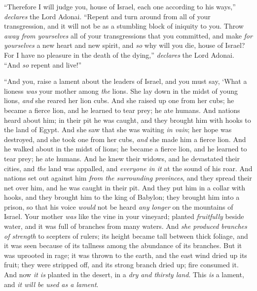 \begin{biblechapter}
\verse “Therefore I will judge you, house of Israel, each one according to his ways,” \textit{declares} the Lord Adonai. “Repent and turn around from all of your transgression, and it will not be as a stumbling block of iniquity to you.
\verse Throw \textit{away from yourselves} all of your transgressions that you committed, and make \textit{for yourselves} a new heart and new spirit, and \textit{so} why will you die, house of Israel?
\verse For I have no pleasure in the death of the dying,” \textit{declares} the Lord Adonai. “And \textit{so} repent and live!”
\end{biblechapter}

\begin{biblechapter} %
 “And you, raise a lament about the leaders of Israel,
\verse and you must say,
\verse ‘What a lioness \textit{was} your mother 
among \textit{the} lions. 
She lay down in the midst of young lions, 
\textit{and} she reared her lion cubs.
\verse And she raised up one from her cubs; 
he became a fierce lion, 
and he learned to tear prey; 
he ate humans.
\verse And nations heard about him; 
in their pit he was caught, 
and they brought him with hooks 
to the land of Egypt.
\verse And she saw that she was waiting \textit{in vain}; 
her hope was destroyed, 
and she took one from her cubs, 
\textit{and} she made him a fierce lion.
\verse And he walked about in the midst of lions; 
he became a fierce lion, 
and he learned to tear prey; 
he ate humans.
\verse And he knew their widows, 
and he devastated their cities, 
and \textit{the} land was appalled, and \textit{everyone in it} 
at the sound of his roar.
\verse And nations set out against him 
\textit{from the surrounding provinces}, 
and they spread their net over him, 
and he was caught in their pit.
\verse And they put him in a collar with hooks, 
and they brought him to the king of Babylon; 
they brought him into a prison, 
so that his voice \textit{would} not be heard \textit{any longer} 
on the mountains of Israel.
\verse Your mother \textit{was} like the vine in your vineyard; 
planted \textit{fruitfully} beside water, 
and it was full of branches 
from many waters.
\verse And \textit{she produced branches of strength} 
to scepters of rulers; 
its height became tall 
between thick foliage, 
and it was seen because of its tallness 
among the abundance of its branches.
\verse But it was uprooted in rage; 
it was thrown to the earth, 
and the east wind dried up its fruit; 
they were stripped off, 
and its strong branch dried up; 
fire consumed it.
\verse And now \textit{it is} planted in the desert, 
in a \textit{dry and thirsty land}. This \textit{is} a lament, and \textit{it will be used as a lament}.
\end{biblechapter}

